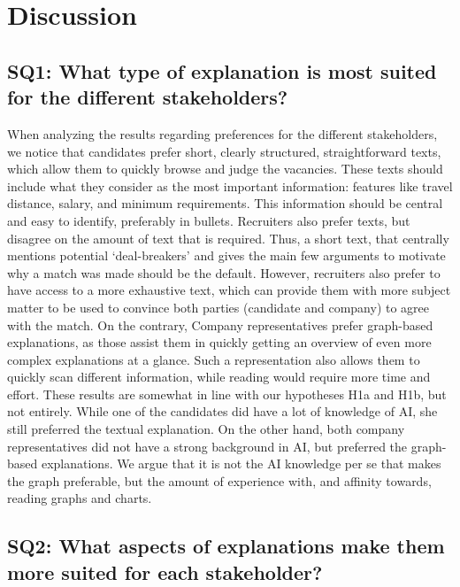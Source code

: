 \section{Discussion}

\subsection{SQ1: What type of explanation is most suited for the different stakeholders?}

When analyzing the results regarding preferences for the different stakeholders, we notice that candidates prefer short, clearly structured, straightforward texts, which allow them to quickly browse and judge the vacancies. These texts should include what they consider as the most important information: features like travel distance, salary, and minimum requirements. This information should be central and easy to identify, preferably in bullets. Recruiters also prefer texts, but disagree on the amount of text that is required. Thus, a short text, that centrally mentions potential `deal-breakers' and gives the main few arguments to motivate why a match was made should be the default. However, recruiters also prefer to have access to a more exhaustive text, which can provide them with more subject matter to be used to convince both parties (candidate and company) to agree with the match. On the contrary, Company representatives prefer graph-based explanations, as those assist them in quickly getting an overview of even more complex explanations at a glance. Such a representation also allows them to quickly scan different information, while reading would require more time and effort. These results are somewhat in line with our hypotheses H1a and H1b, but not entirely. While one of the candidates did have a lot of knowledge of AI, she still preferred the textual explanation. On the other hand, both company representatives did not have a strong background in AI, but preferred the graph-based explanations. We argue that it is not the AI knowledge per se that makes the graph preferable, but the amount of experience with, and affinity towards, reading graphs and charts.

\subsection{SQ2: What aspects of explanations make them more suited for each stakeholder?}

